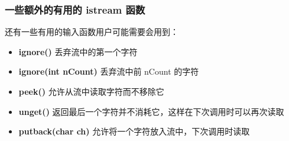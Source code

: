 \documentclass[../../LearnCpp.tex]{subfiles}
\begin{document}
\subsubsection*{一些额外的有用的 istream 函数}

还有一些有用的输入函数用户可能需要会用到：

\begin{itemize}
    \item \textbf{ignore()} 丢弃流中的第一个字符
    \item \textbf{ignore(int nCount)} 丢弃流中前 nCount 的字符
    \item \textbf{peek()} 允许从流中读取字符而不移除它
    \item \textbf{unget()} 返回最后一个字符并不消耗它，这样在下次调用时可以再次读取
    \item \textbf{putback(char ch)} 允许将一个字符放入流中，下次调用时读取
\end{itemize}
\end{document}
